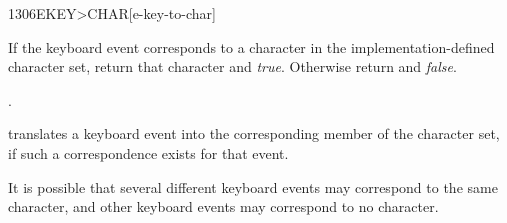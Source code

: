 \begin{worddef}[EKEYtoCHAR]{1306}{EKEY>CHAR}[e-key-to-char]
\item {}

	If the keyboard event  corresponds to a character in the
	implementation-defined character set, return that character and
	\emph{true}. Otherwise return  and \emph{false}.

\see {}.

	\begin{rationale} %
		 translates a keyboard event into the
		corresponding member of the character set, if such a
		correspondence exists for that event.

		It is possible that several different keyboard events may
		correspond to the same character, and other keyboard events
		may correspond to no character.
	\end{rationale}
\end{worddef}




